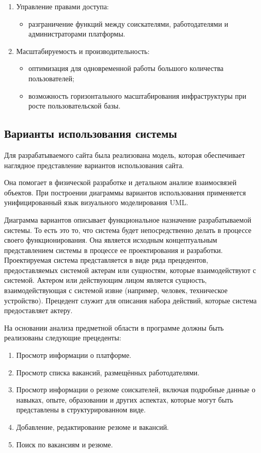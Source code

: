 \begin{enumerate}
\begin{itemize}
		\item интуитивно понятная навигация с персонализированными дашбордами для соискателей и работодателей;
		\item  возможность настройки интерфейса под индивидуальные предпочтения пользователя.
	\end{itemize}
	\item Управление правами доступа:
	\begin{itemize}
		\item  разграничение функций между соискателями, работодателями и администраторами платформы.
	\end{itemize}
	\item Масштабируемость и производительность:
	\begin{itemize}
		\item оптимизация для одновременной работы большого количества пользователей;
		\item возможность горизонтального масштабирования инфраструктуры при росте пользовательской базы.
	\end{itemize}
\end{enumerate}

\subsection{Варианты использования системы}

Для разрабатываемого сайта была реализована модель, которая обеспечивает наглядное представление вариантов использования сайта.

Она помогает в физической разработке и детальном анализе взаимосвязей объектов. При построении диаграммы вариантов использования применяется унифицированный язык визуального моделирования UML.

Диаграмма вариантов описывает функциональное назначение разрабатываемой системы. То есть это то, что система будет непосредственно делать в процессе своего функционирования. Она является исходным концептуальным представлением системы в процессе ее проектирования и разработки. Проектируемая система представляется в виде ряда прецедентов, предоставляемых системой актерам или сущностям, которые взаимодействуют с системой. Актером или действующим лицом является сущность, взаимодействующая с системой извне (например, человек, техническое устройство). Прецедент служит для описания набора действий, которые система предоставляет актеру.

На основании анализа предметной области в программе должны быть реализованы следующие прецеденты:
\begin{enumerate}
	\item Просмотр информации о платформе.
	\item Просмотр списка вакансий, размещённых работодателями.
	\item Просмотр информации о резюме соискателей, включая подробные данные о навыках, опыте, образовании и других аспектах, которые могут быть представлены в структурированном виде.
	\item Добавление, редактирование резюме и вакансий.
	\item Поиск по вакансиям и резюме.
\end{enumerate}

